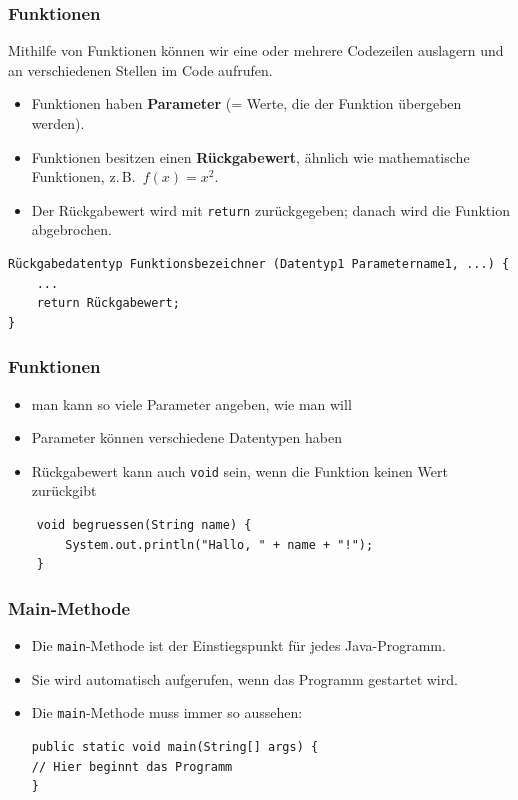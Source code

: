 \documentclass{../../presentation}
\begin{document}
\begin{frame}[fragile]
    \frametitle{Funktionen}
    Mithilfe von Funktionen können wir eine oder mehrere Codezeilen auslagern und an verschiedenen Stellen im Code aufrufen.
    \begin{itemize}
        \item Funktionen haben \textbf{Parameter} (= Werte, die der Funktion übergeben werden).
        \item Funktionen besitzen einen \textbf{Rückgabewert}, ähnlich wie mathematische Funktionen, z.\,B.\ $f(x) = x^2$.
        \item Der Rückgabewert wird mit \texttt{return} zurückgegeben; danach wird die Funktion abgebrochen.
    \end{itemize}
    \begin{verbatim}
Rückgabedatentyp Funktionsbezeichner (Datentyp1 Parametername1, ...) {
    ...
    return Rückgabewert;
}
\end{verbatim}
\end{frame}

\begin{frame}[fragile]
    \frametitle{Funktionen}
    \begin{itemize}
        \item man kann so viele Parameter angeben, wie man will
        \item Parameter können verschiedene Datentypen haben
        \item Rückgabewert kann auch \texttt{void} sein, wenn die Funktion keinen Wert zurückgibt
    \end{itemize}
    \begin{verbatim}
    void begruessen(String name) {
        System.out.println("Hallo, " + name + "!");
    }
    \end{verbatim}
\end{frame}


\begin{frame}[fragile]
    \frametitle{Main-Methode}
    \begin{itemize}
        \item Die \texttt{main}-Methode ist der Einstiegspunkt für jedes Java-Programm.
        \item Sie wird automatisch aufgerufen, wenn das Programm gestartet wird.
        \item Die \texttt{main}-Methode muss immer so aussehen:
              \begin{verbatim}
public static void main(String[] args) {
// Hier beginnt das Programm
}
\end{verbatim}
    \end{itemize}
\end{frame}
\end{document}
